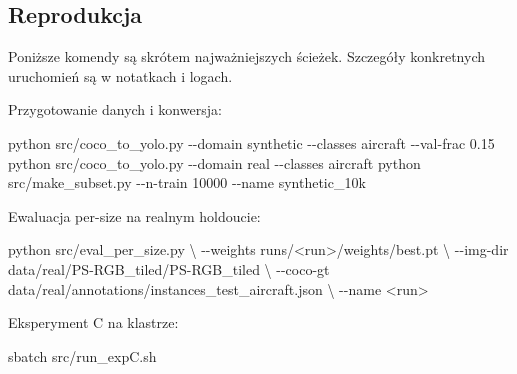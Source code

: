 \documentclass[
  11pt,
]{article}
\newenvironment{Shaded}{}{}
\newcommand{\AttributeTok}[1]{\textcolor[rgb]{0.49,0.56,0.16}{#1}}
\newcommand{\DataTypeTok}[1]{\textcolor[rgb]{0.56,0.13,0.00}{#1}}
\newcommand{\ExtensionTok}[1]{#1}
\newcommand{\NormalTok}[1]{#1}
\newcommand{\OperatorTok}[1]{\textcolor[rgb]{0.40,0.40,0.40}{#1}}
\begin{document}
\hypertarget{reprodukcja}{%
\subsection{Reprodukcja}\label{reprodukcja}}

Poniższe komendy są skrótem najważniejszych ścieżek. Szczegóły
konkretnych uruchomień są w notatkach i logach.

Przygotowanie danych i konwersja:

\begin{Shaded}
\begin{Highlighting}[]
\ExtensionTok{python}\NormalTok{ src/coco\_to\_yolo.py }\AttributeTok{{-}{-}domain}\NormalTok{ synthetic }\AttributeTok{{-}{-}classes}\NormalTok{ aircraft }\AttributeTok{{-}{-}val{-}frac}\NormalTok{ 0.15}
\ExtensionTok{python}\NormalTok{ src/coco\_to\_yolo.py }\AttributeTok{{-}{-}domain}\NormalTok{ real }\AttributeTok{{-}{-}classes}\NormalTok{ aircraft}
\ExtensionTok{python}\NormalTok{ src/make\_subset.py }\AttributeTok{{-}{-}n{-}train}\NormalTok{ 10000 }\AttributeTok{{-}{-}name}\NormalTok{ synthetic\_10k}
\end{Highlighting}
\end{Shaded}

Ewaluacja per-size na realnym holdoucie:

\begin{Shaded}
\begin{Highlighting}[]
\ExtensionTok{python}\NormalTok{ src/eval\_per\_size.py }\DataTypeTok{\textbackslash{}}
  \AttributeTok{{-}{-}weights}\NormalTok{ runs/}\OperatorTok{\textless{}}\NormalTok{run}\OperatorTok{\textgreater{}}\NormalTok{/weights/best.pt }\DataTypeTok{\textbackslash{}}
  \AttributeTok{{-}{-}img{-}dir}\NormalTok{ data/real/PS{-}RGB\_tiled/PS{-}RGB\_tiled }\DataTypeTok{\textbackslash{}}
  \AttributeTok{{-}{-}coco{-}gt}\NormalTok{ data/real/annotations/instances\_test\_aircraft.json }\DataTypeTok{\textbackslash{}}
  \AttributeTok{{-}{-}name} \OperatorTok{\textless{}}\NormalTok{run}\OperatorTok{\textgreater{}}
\end{Highlighting}
\end{Shaded}

Eksperyment C na klastrze:

\begin{Shaded}
\begin{Highlighting}[]
\ExtensionTok{sbatch}\NormalTok{ src/run\_expC.sh}
\end{Highlighting}
\end{Shaded}
\end{document}
